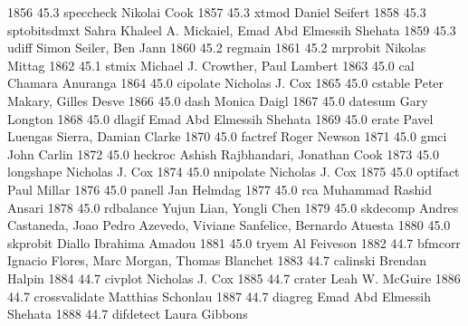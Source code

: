   1856     45.3    speccheck     Nikolai Cook                            
  1857     45.3    xtmod         Daniel Seifert                          
  1858     45.3    sptobitsdmxt  Sahra Khaleel A. Mickaiel, Emad Abd     
                                   Elmessih Shehata                        
  1859     45.3    udiff         Simon Seiler, Ben Jann                  
  1860     45.2    regmain                                               
  1861     45.2    mrprobit      Nikolas Mittag                          
  1862     45.1    stmix         Michael J. Crowther, Paul Lambert       
  1863     45.0    cal           Chamara Anuranga                        
  1864     45.0    cipolate      Nicholas J. Cox                         
  1865     45.0    cstable       Peter Makary, Gilles Desve              
  1866     45.0    dash          Monica Daigl                            
  1867     45.0    datesum       Gary Longton                            
  1868     45.0    dlagif        Emad Abd Elmessih Shehata               
  1869     45.0    erate         Pavel Luengas Sierra, Damian Clarke     
  1870     45.0    factref       Roger Newson                            
  1871     45.0    gmci          John Carlin                             
  1872     45.0    heckroc       Ashish Rajbhandari, Jonathan Cook       
  1873     45.0    longshape     Nicholas J. Cox                         
  1874     45.0    nnipolate     Nicholas J. Cox                         
  1875     45.0    optifact      Paul Millar                             
  1876     45.0    panell        Jan Helmdag                             
  1877     45.0    rca           Muhammad Rashid Ansari                  
  1878     45.0    rdbalance     Yujun Lian, Yongli Chen                 
  1879     45.0    skdecomp      Andres Castaneda, Joao Pedro Azevedo,   
                                   Viviane Sanfelice, Bernardo Atuesta     
  1880     45.0    skprobit      Diallo Ibrahima Amadou                  
  1881     45.0    tryem         Al Feiveson                             
  1882     44.7    bfmcorr       Ignacio Flores, Marc Morgan, Thomas     
                                   Blanchet                                
  1883     44.7    calinski      Brendan Halpin                          
  1884     44.7    civplot       Nicholas J. Cox                         
  1885     44.7    crater        Leah W. McGuire                         
  1886     44.7    crossvalidate  Matthias Schonlau                       
  1887     44.7    diagreg       Emad Abd Elmessih Shehata               
  1888     44.7    difdetect     Laura Gibbons                           
